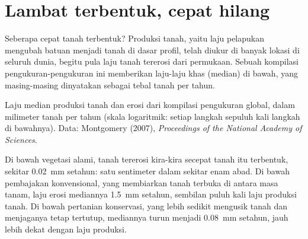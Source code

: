 \section{Lambat terbentuk, cepat hilang}

Seberapa cepat tanah terbentuk? Produksi tanah, yaitu laju pelapukan mengubah
batuan menjadi tanah di dasar profil, telah diukur di banyak lokasi di seluruh
dunia, begitu pula laju tanah tererosi dari permukaan. Sebuah kompilasi
pengukuran-pengukuran ini memberikan laju-laju khas (median) di bawah, yang
masing-masing dinyatakan sebagai tebal tanah per tahun.

\begin{omfigure}

{\small Laju median produksi tanah dan erosi dari kompilasi pengukuran
global, dalam milimeter tanah per tahun (skala logaritmik: setiap langkah
sepuluh kali langkah di bawahnya).
Data: Montgomery (2007), \emph{Proceedings of the National Academy of Sciences}.}
\end{omfigure}

Di bawah vegetasi alami, tanah tererosi kira-kira secepat tanah itu terbentuk,
sekitar \qty{0.02}{mm} setahun: satu sentimeter dalam sekitar enam abad. Di
bawah pembajakan konvensional, yang membiarkan tanah terbuka di antara masa
tanam, laju erosi mediannya \qty{1.5}{mm} setahun, sembilan puluh kali laju
produksi tanah. Di bawah pertanian konservasi, yang lebih sedikit mengusik
tanah dan menjaganya tetap tertutup, mediannya turun menjadi \qty{0.08}{mm}
setahun, jauh lebih dekat dengan laju produksi.

